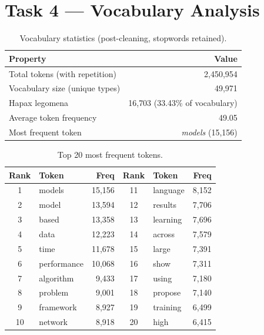 \documentclass[10pt,a4paper]{article}
\begin{document}
\section{Task 4 --- Vocabulary Analysis}

\begin{table}[H]
\centering
\caption{Vocabulary statistics (post-cleaning, stopwords retained).}
\begin{tabular}{lr}
\toprule
\textbf{Property} & \textbf{Value} \\
\midrule
Total tokens (with repetition) & 2{,}450{,}954 \\
Vocabulary size (unique types) & 49{,}971 \\
Hapax legomena                 & 16{,}703 \quad (33.43\% of vocabulary) \\
Average token frequency        & 49.05 \\
Most frequent token            & \emph{models} (15{,}156) \\
\bottomrule
\end{tabular}
\end{table}

\begin{table}[H]
\centering
\caption{Top 20 most frequent tokens.}
\begin{tabular}{clrclr}
\toprule
\textbf{Rank} & \textbf{Token} & \textbf{Freq} &
\textbf{Rank} & \textbf{Token} & \textbf{Freq} \\
\midrule
1  & models      & 15{,}156 & 11 & language    &  8{,}152 \\
2  & model       & 13{,}594 & 12 & results     &  7{,}706 \\
3  & based       & 13{,}358 & 13 & learning    &  7{,}696 \\
4  & data        & 12{,}223 & 14 & across      &  7{,}579 \\
5  & time        & 11{,}678 & 15 & large       &  7{,}391 \\
6  & performance & 10{,}068 & 16 & show        &  7{,}311 \\
7  & algorithm   &  9{,}433 & 17 & using       &  7{,}180 \\
8  & problem     &  9{,}001 & 18 & propose     &  7{,}140 \\
9  & framework   &  8{,}927 & 19 & training    &  6{,}499 \\
10 & network     &  8{,}918 & 20 & high        &  6{,}415 \\
\bottomrule
\end{tabular}
\end{table}
\end{document}
